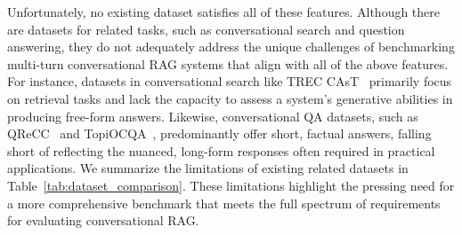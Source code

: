 \documentclass[11pt]{article}
\begin{document}

Unfortunately, no existing dataset satisfies all of these features.
Although there are datasets for related tasks, such as conversational search and question answering, they do not adequately address the unique challenges of benchmarking multi-turn conversational RAG systems that align with all of the above features. For instance, datasets in conversational search like TREC CAsT~\citep{cast19,cast20,cast21,cast22} primarily focus on retrieval tasks and lack the capacity to assess a system's generative abilities in producing free-form answers. Likewise, conversational QA datasets, such as QReCC~\citep{Anantha_naacl21_cqr} and TopiOCQA~\citep{topiocqa}, predominantly offer short, factual answers, falling short of reflecting the nuanced, long-form responses often required in practical applications. 
We summarize the limitations of existing related datasets in Table~\ref{tab:dataset_comparison}.
These limitations highlight the pressing need for a more comprehensive benchmark that meets the full spectrum of requirements for evaluating conversational RAG.
\end{document}
